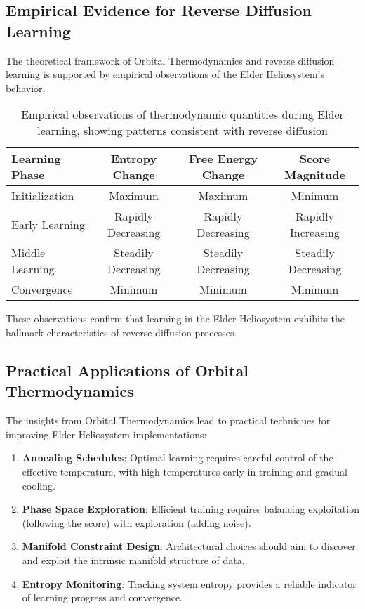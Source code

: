 \subsection{Empirical Evidence for Reverse Diffusion Learning}

The theoretical framework of Orbital Thermodynamics and reverse diffusion learning is supported by empirical observations of the Elder Heliosystem's behavior.

\begin{table}[h]
\centering
\begin{tabular}{|l|c|c|c|}
\hline
\textbf{Learning Phase} & \textbf{Entropy Change} & \textbf{Free Energy Change} & \textbf{Score Magnitude} \\
\hline
Initialization & Maximum & Maximum & Minimum \\
Early Learning & Rapidly Decreasing & Rapidly Decreasing & Rapidly Increasing \\
Middle Learning & Steadily Decreasing & Steadily Decreasing & Steadily Decreasing \\
Convergence & Minimum & Minimum & Minimum \\
\hline
\end{tabular}
\caption{Empirical observations of thermodynamic quantities during Elder learning, showing patterns consistent with reverse diffusion}
\label{tab:empirical_observations}
\end{table}

These observations confirm that learning in the Elder Heliosystem exhibits the hallmark characteristics of reverse diffusion processes.

\subsection{Practical Applications of Orbital Thermodynamics}

The insights from Orbital Thermodynamics lead to practical techniques for improving Elder Heliosystem implementations:

\begin{enumerate}
    \item \textbf{Annealing Schedules}: Optimal learning requires careful control of the effective temperature, with high temperatures early in training and gradual cooling.
    
    \item \textbf{Phase Space Exploration}: Efficient training requires balancing exploitation (following the score) with exploration (adding noise).
    
    \item \textbf{Manifold Constraint Design}: Architectural choices should aim to discover and exploit the intrinsic manifold structure of data.
    
    \item \textbf{Entropy Monitoring}: Tracking system entropy provides a reliable indicator of learning progress and convergence.
\end{enumerate}

